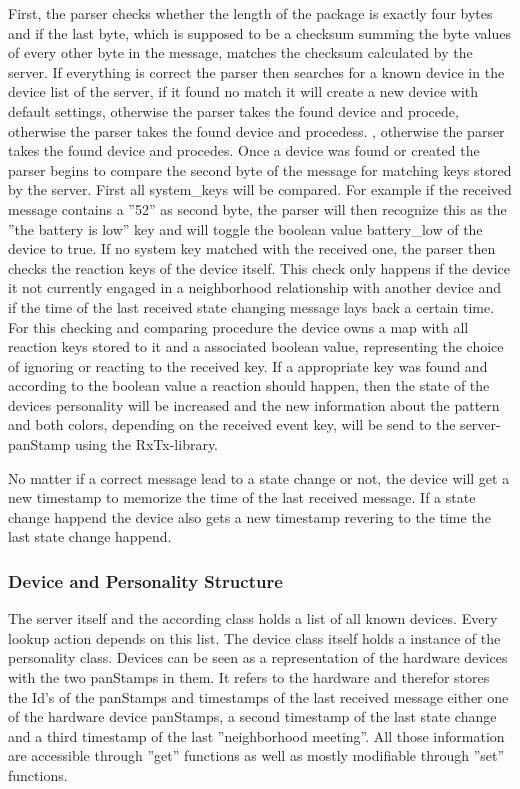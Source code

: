 First, the parser checks whether the length of the package is exactly four bytes
and if the last byte, which is supposed to be a checksum summing the byte values
of every other byte in the message, matches the checksum calculated by the
server. If everything is correct the parser then searches for a known device in
the device list of the server, if it found no match it will create a new device
with default settings, otherwise the parser takes the found device and procede,
otherwise the parser takes the found device and procedess. , otherwise the
parser takes the found device and procedes. Once a device was found or created the parser begins to compare the second byte of the message for matching keys stored by the server. First all system\_keys will be compared. For example if the received message contains a ''52'' as second byte, the parser will then recognize this as the ''the battery is low'' key and will toggle the boolean value battery\_low of the device to true. 
If no system key matched with the received one, the parser then checks the
reaction keys of the device itself. This check only happens if the device it not
currently engaged in a neighborhood relationship with another device and if the
time of the last received state changing message lays back a certain time. For
this checking and comparing procedure the device owns a map with all reaction
keys stored to it and a associated boolean value, representing the choice of
ignoring or reacting to the received key. If a appropriate key was found and
according to the boolean value a reaction should happen, then the state of the
devices personality will be increased and the new information about the pattern
and both colors, depending on the received event key, will be send to the
server-panStamp using the RxTx-library. 

No matter if a correct message lead to a state change or not, the device will
get a new timestamp to memorize the time of the last received message. If a
state change happend the device also gets a new timestamp revering to the time
the last state change happend.

\subsubsection{Device and Personality Structure}
The server itself and the according class holds a list of all known devices. Every lookup action depends on this list. The device class itself holds a instance of the personality class.
Devices can be seen as a representation of the hardware devices with the two panStamps in them. It refers to the hardware and therefor stores the Id's of the panStamps and timestamps of the last received message either one of the hardware device panStamps, a second timestamp of the last state change and a third timestamp of the last ''neighborhood meeting''. All those information are accessible through ''get'' functions as well as mostly modifiable through ''set'' functions.

